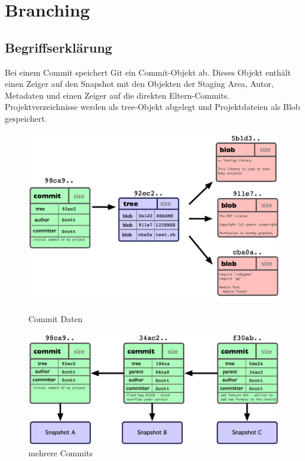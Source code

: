 \chapter{Branching}
\section{Begriffserklärung}
Bei einem Commit speichert Git ein Commit-Objekt ab. Dieses Objekt enthält einen Zeiger auf den Snapshot mit den Objekten der Staging Area, Autor, Metadaten und einen Zeiger auf die direkten Eltern-Commits. Projektverzeichnisse werden als tree-Objekt abgelegt und Projektdateien als Blob gespeichert.
\begin{figure}[htb]
    \centering
    \begin{minipage}[t]{0.48\linewidth}
        \centering
        \includegraphics[width=\linewidth]{img/tree.png}
        \caption{Commit Daten}
    \end{minipage}%
    \hfill
    \begin{minipage}[t]{0.48\linewidth}
        \centering
        \includegraphics[width=\linewidth]{img/commits.png}
        \caption{mehrere Commits}
    \end{minipage}
\end{figure}

